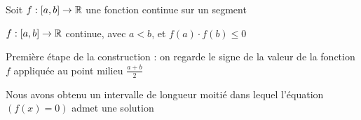 \begin{frame}

\begin{theoreme}
Soit $f:[a,b]\to\mathbb{R}$ une fonction continue sur un segment
\end{theoreme}

\pause


\end{frame}


\begin{frame}

$f : [a,b] \to \mathbb{R}$ continue, avec $a < b$, et $f(a)\cdot f(b)\le0$

\pause

Première étape de la construction : on regarde le signe 
de la valeur de la fonction $f$ appliquée au point milieu $\frac{a+b}{2}$

\pause

\begin{itemize}
\end{itemize}


\pause\pause\pause

Nous avons obtenu un intervalle de longueur moitié dans 
lequel l'équation $(f(x)=0)$ admet une solution


\end{frame}




